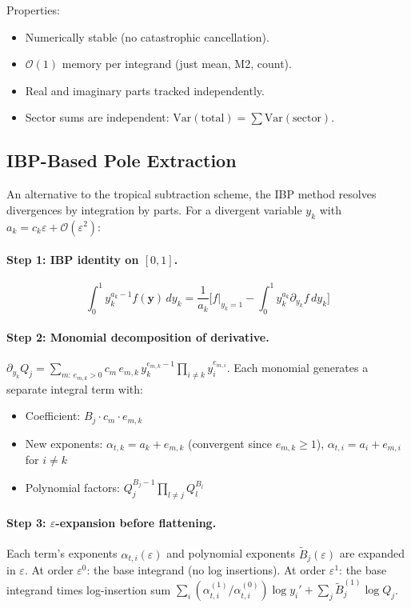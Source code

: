 \documentclass[11pt,a4paper]{article}
\begin{document}
Properties:
\begin{itemize}
  \item Numerically stable (no catastrophic cancellation).
  \item $\mathcal{O}(1)$ memory per integrand (just mean, M2, count).
  \item Real and imaginary parts tracked independently.
  \item Sector sums are independent: $\mathrm{Var}(\mathrm{total}) = \sum \mathrm{Var}(\mathrm{sector})$.
\end{itemize}

\subsection{IBP-Based Pole Extraction}

An alternative to the tropical subtraction scheme, the IBP method resolves divergences by integration by parts.  For a divergent variable $y_k$ with $a_k = c_k\varepsilon + \mathcal{O}(\varepsilon^2)$:

\paragraph{Step 1: IBP identity on $[0,1]$.}
\begin{equation}
\int_0^1 y_k^{a_k-1}f(\mathbf{y})\,dy_k = \frac{1}{a_k}\bigl[f\big|_{y_k=1} - \int_0^1 y_k^{a_k}\partial_{y_k}f\,dy_k\bigr]
\end{equation}

\paragraph{Step 2: Monomial decomposition of derivative.}
$\partial_{y_k}Q_j = \sum_{m:\,e_{m,k}>0} c_m\,e_{m,k}\,y_k^{e_{m,k}-1}\prod_{i\neq k}y_i^{e_{m,i}}$.
Each monomial generates a separate integral term with:
\begin{itemize}
\item Coefficient: $B_j \cdot c_m \cdot e_{m,k}$
\item New exponents: $\alpha_{t,k} = a_k + e_{m,k}$ (convergent since $e_{m,k}\geq 1$), $\alpha_{t,i} = a_i + e_{m,i}$ for $i\neq k$
\item Polynomial factors: $Q_j^{B_j-1}\prod_{l\neq j}Q_l^{B_l}$
\end{itemize}

\paragraph{Step 3: $\varepsilon$-expansion before flattening.}
Each term's exponents $\alpha_{t,i}(\varepsilon)$ and polynomial exponents $\tilde{B}_j(\varepsilon)$ are expanded in $\varepsilon$.  At order $\varepsilon^0$: the base integrand (no log insertions).  At order $\varepsilon^1$: the base integrand times log-insertion sum $\sum_i(\alpha_{t,i}^{(1)}/\alpha_{t,i}^{(0)})\log y_i' + \sum_j\tilde{B}_j^{(1)}\log Q_j$.
\end{document}
